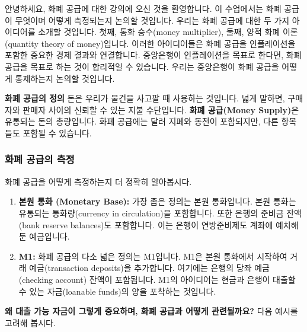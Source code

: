 \documentclass[11pt,a4paper]{book}
\theoremstyle{definition}
\begin{document}
안녕하세요, 화폐 공급에 대한 강의에 오신 것을 환영합니다. 이 수업에서는 화폐 공급이 무엇이며 어떻게 측정되는지 논의할 것입니다. 우리는 화폐 공급에 대한 두 가지 아이디어를 소개할 것입니다. 첫째, 통화 승수(money multiplier), 둘째, 양적 화폐 이론(quantity theory of money)입니다. 이러한 아이디어들은 화폐 공급을 인플레이션을 포함한 중요한 경제 결과와 연결합니다. 중앙은행이 인플레이션을 목표로 한다면, 화폐 공급을 목표로 하는 것이 합리적일 수 있습니다. 우리는 중앙은행이 화폐 공급을 어떻게 통제하는지 논의할 것입니다.

\begin{conceptbox}
\textbf{화폐 공급의 정의}
돈은 우리가 물건을 사고팔 때 사용하는 것입니다. 넓게 말하면, 구매자와 판매자 사이의 신뢰할 수 있는 지불 수단입니다. \textbf{화폐 공급(Money Supply)}은 유통되는 돈의 총량입니다. 화폐 공급에는 달러 지폐와 동전이 포함되지만, 다른 항목들도 포함될 수 있습니다.
\end{conceptbox}

\subsubsection*{화폐 공급의 측정}
화폐 공급을 어떻게 측정하는지 더 정확히 알아봅시다.

\begin{enumerate}
    \item \textbf{본원 통화 (Monetary Base):} 가장 좁은 정의는 본원 통화입니다. 본원 통화는 유통되는 통화량(currency in circulation)을 포함합니다. 또한 은행의 준비금 잔액(bank reserve balances)도 포함합니다. 이는 은행이 연방준비제도 계좌에 예치해 둔 예금입니다.
    \item \textbf{M1:} 화폐 공급의 다소 넓은 정의는 M1입니다. M1은 본원 통화에서 시작하여 거래 예금(transaction deposits)을 추가합니다. 여기에는 은행의 당좌 예금(checking account) 잔액이 포함됩니다. M1의 아이디어는 현금과 은행이 대출할 수 있는 자금(loanable funds)의 양을 포착하는 것입니다.
\end{enumerate}

\textbf{왜 대출 가능 자금이 그렇게 중요하며, 화폐 공급과 어떻게 관련될까요?}
다음 예시를 고려해 봅시다.
\end{document}
